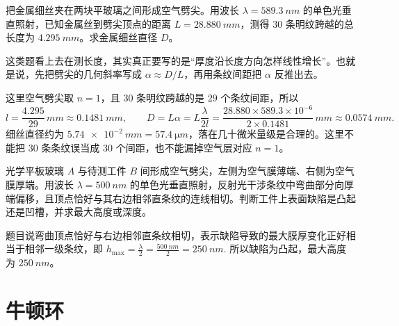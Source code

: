 \documentclass[lang=cn,11pt]{elegantbook}
\begin{document}
\begin{exercise}[用劈尖条纹间距测金属细丝直径时为什么先写几何斜率]
把金属细丝夹在两块平玻璃之间形成空气劈尖。用波长 \(\lambda=\SI{589.3}{nm}\) 的单色光垂直照射，已知金属丝到劈尖顶点的距离 \(L=\SI{28.880}{mm}\)，测得 \(30\) 条明纹跨越的总长度为 \(\SI{4.295}{mm}\)。求金属细丝直径 \(D\)。
\end{exercise}

\begin{solution}
这类题看上去在测长度，其实真正要写的是“厚度沿长度方向怎样线性增长”。也就是说，先把劈尖的几何斜率写成 \(\alpha\approx D/L\)，再用条纹间距把 \(\alpha\) 反推出去。

这里空气劈尖取 \(n=1\)，且 \(30\) 条明纹跨越的是 \(29\) 个条纹间距，所以
\[
l=\frac{4.295}{29}\,\si{mm}\approx \SI{0.1481}{mm},\qquad
D=L\alpha=L\frac{\lambda}{2l}
=\frac{28.880\times 589.3\times10^{-6}}{2\times0.1481}\,\si{mm}
\approx \SI{0.0574}{mm}.
\]
细丝直径约为 \(\SI{5.74e-2}{mm}=\SI{57.4}{\micro m}\)，落在几十微米量级是合理的。这里不能把 \(30\) 条条纹误当成 \(30\) 个间距，也不能漏掉空气层对应 \(n=1\)。
\end{solution}


\begin{exercise}[空气劈尖条纹弯向厚端时怎样判断凸凹缺陷]
光学平板玻璃 \(A\) 与待测工件 \(B\) 间形成空气劈尖，左侧为空气膜薄端、右侧为空气膜厚端。用波长 \(\lambda=\SI{500}{nm}\) 的单色光垂直照射，反射光干涉条纹中弯曲部分向厚端偏移，且顶点恰好与其右边相邻直条纹的连线相切。判断工件上表面缺陷是凸起还是凹槽，并求最大高度或深度。
\end{exercise}

\begin{solution}
题目说弯曲顶点恰好与右边相邻直条纹相切，表示缺陷导致的最大膜厚变化正好相当于相邻一级条纹，即
 \(h_{\max}=\frac{\lambda}{2} =\frac{\SI{500}{nm}}{2} =\SI{250}{nm}.\) 
所以缺陷为凸起，最大高度为 \(\SI{250}{nm}\)。
\end{solution}

\section{牛顿环}
\end{document}

